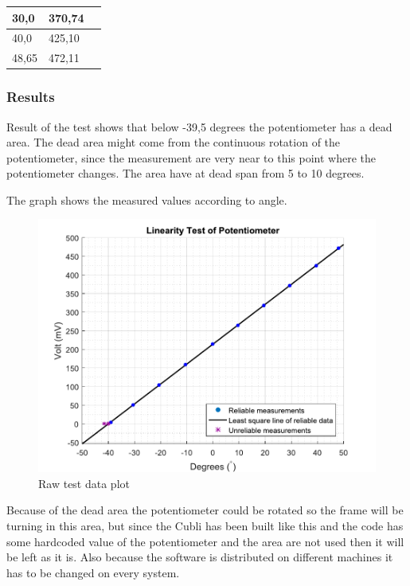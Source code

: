 \begin{table}[H]
\begin{tabular}{|l|l|p{4.3cm}|}
		30,0                              			  & 370,74               \\
		\hline%
		40,0                                          & 425,10               \\
		\hline%
		48,65 										  & 472,11               \\
		\hline%
	\end{tabular}
\end{table}


\subsubsection{Results}
Result of the test shows that below -39,5 degrees the potentiometer has a dead area. The dead area might come from the continuous rotation of the potentiometer, since the measurement are very near to this point where the potentiometer changes. The area have at dead span from 5 to 10 degrees.

The graph shows the measured values according to angle.

\begin{figure}[H] 
	\centering 
	\includegraphics[scale=0.7]{figures/linearityOfPotmeterTest2-1}
	\caption{Raw test data plot}
	\label{linearityOfPotmeterTest2-1}
\end{figure}
Because of the dead area the potentiometer could be rotated so the frame will be turning in this area, but since the Cubli has been built like this and the code has some hardcoded value of the potentiometer and the area are not used then it will be left as it is. Also because the software is distributed on different machines it has to be changed on every system.


